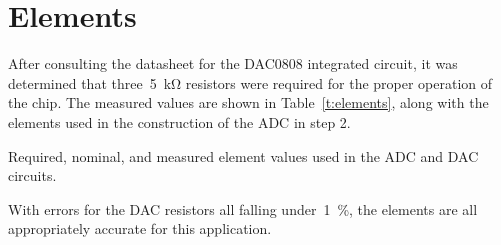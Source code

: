 \section{Elements}

After consulting the datasheet for the DAC0808 integrated circuit, it was
determined that three~\SI{5}{\kilo\ohm} resistors were required for the proper
operation of the chip.  The measured values are shown in
Table~\ref{t:elements}, along with the elements used in the construction of the
ADC in step 2.
%
\begin{table}[H]
\centering
	
	\parbox{.8\textwidth}{
	\caption[List of used elements]{Required, nominal, and measured element
	values used in the ADC and DAC circuits.}
	\label{t:elements}}
\end{table}
%
With errors for the DAC resistors all falling under~\SI{1}{\percent}, the
elements are all appropriately accurate for this application.
